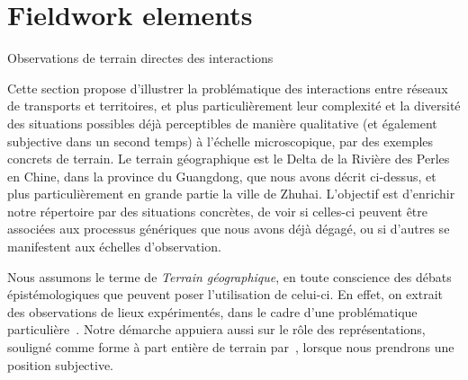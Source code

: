 


\newpage


\section{Fieldwork elements}{Observations de terrain directes des interactions}

\label{sec:qualitative}




Cette section propose d'illustrer la problématique des interactions entre réseaux de transports et territoires, et plus particulièrement leur complexité et la diversité des situations possibles déjà perceptibles de manière qualitative (et également subjective dans un second temps) à l'échelle microscopique, par des exemples concrets de terrain. Le terrain géographique est le Delta de la Rivière des Perles en Chine, dans la province du Guangdong, que nous avons décrit ci-dessus, et plus particulièrement en grande partie la ville de Zhuhai. L'objectif est d'enrichir notre répertoire par des situations concrètes, de voir si celles-ci peuvent être associées aux processus génériques que nous avons déjà dégagé, ou si d'autres se manifestent aux échelles d'observation.


Nous assumons le terme de \emph{Terrain géographique}, en toute conscience des débats épistémologiques que peuvent poser l'utilisation de celui-ci. En effet, on extrait des observations de lieux expérimentés, dans le cadre d'une problématique particulière~\cite{retaille2010terrain}. Notre démarche appuiera aussi sur le rôle des représentations, souligné comme forme à part entière de terrain par~\cite{lefort2012terrain}, lorsque nous prendrons une position subjective.



